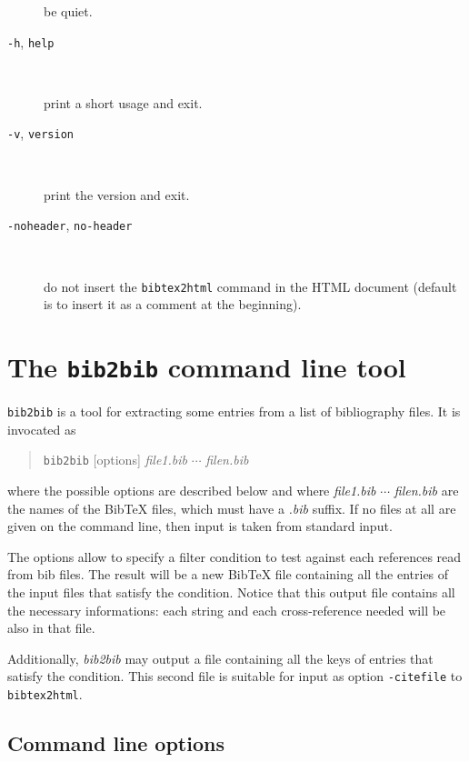 \documentclass[11pt,a4paper]{article}
\newcommand{\mm}{\symbol{45}\symbol{45}}
\begin{document}
\begin{description}
  be quiet.

\item[\texttt{-h}, \texttt{\mm{}help}] ~

  print a short usage and exit.

\item[\texttt{-v}, \texttt{\mm{}version}] ~

  print the version and exit.

\item[\texttt{-noheader}, \texttt{\mm{}no-header}] ~

  do not insert the \texttt{bibtex2html} command in the HTML document
  (default is to insert it as a comment at the beginning).

\end{description}


\section{The \texttt{bib2bib} command line tool}

\texttt{bib2bib} is a tool for extracting some entries from a list of
bibliography files. It is invocated as 
\begin{quote}
\texttt{bib2bib} [options] \textit{file1.bib} $\cdots$ \textit{filen.bib}
\end{quote}
where the possible options are described below and where
\textit{file1.bib} $\cdots$ \textit{filen.bib} are the names of the
BibTeX files, which must have a \textit{.bib} suffix. If no files at
all are given on the command line, then input is taken from standard
input. 

The options allow to specify a filter condition to test against each
references read from bib files. The result will be a new BibTeX file
containing all the entries of the input files that satisfy the
condition. Notice that this output file contains all the necessary
informations: each string and each cross-reference needed will be also
in that file.

Additionally, \textit{bib2bib} may output a file containing all the
keys of entries that satisfy the condition. This second file is
suitable for input as option \verb|-citefile| to \verb|bibtex2html|.

\subsection{Command line options}
\end{document}
